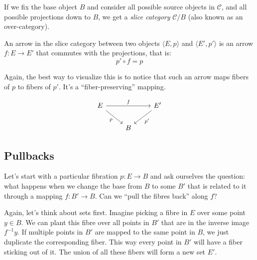 \documentclass[DaoFP]{subfiles}
\begin{document}
If we fix the base object $B$ and consider all possible source objects in $\mathcal{C}$, and all possible projections down to $B$, we get a \emph{slice category} $\mathcal{C}/B$ (also known as an over-category). 

An arrow in the slice category between two objects $\langle E, p \rangle$ and $\langle E', p' \rangle$ is an arrow $f \colon E \to E'$ that commutes with the projections, that is:
\[p' \circ f = p \]

Again, the best way to visualize this is to notice that such an arrow maps fibers of $p$ to fibers of $p'$. It's a ``fiber-preserving'' mapping.

\[
 \begin{tikzcd}
 E
 \arrow[rd, "p"']
 \arrow[rr, "f"]
 && E'
 \arrow[ld, "p'"]
 \\
 &B
  \end{tikzcd}
\]


\subsection{Pullbacks}

 Let's start with a particular fibration $p \colon E \to B$ and ask ourselves the question: what happens when we change the base from $B$ to some $B'$ that is related to it through a mapping $f \colon B' \to B$. Can we ``pull the fibres back'' along $f$? 
 
 Again, let's think about sets first. Imagine picking a fibre in $E$ over some point $y \in B$. We can plant this fibre over all points in $B'$ that are in the inverse image $f^{-1} y$. If multiple points in $B'$ are mapped to the same point in $B$, we just duplicate the corresponding fiber. This way every point in $B'$ will have a fiber sticking out of it. The union of all these fibers will form a new set $E'$.
\end{document}
